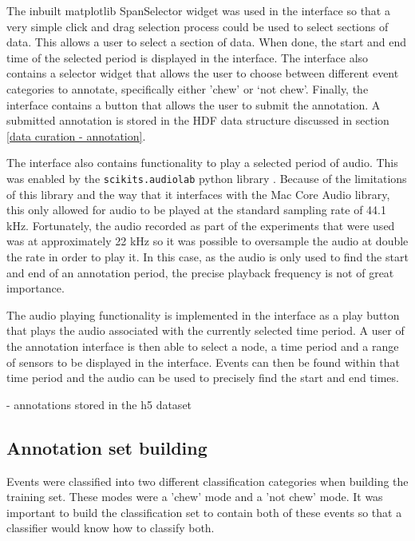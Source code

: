 The inbuilt matplotlib SpanSelector widget was used in the interface so that a very simple click and drag selection process could be used to select sections of data. This allows a user to select a section of data. When done, the start and end time of the selected period is displayed in the interface. The interface also contains a selector widget that allows the user to choose between different event categories to annotate, specifically either 'chew' or `not chew'. Finally, the interface contains a button that allows the user to submit the annotation. A submitted annotation is stored in the HDF data structure discussed in section \ref{data curation - annotation}. 

The interface also contains functionality to play a selected period of audio. This was enabled by the \texttt{scikits.audiolab} python library \cite{Cournapeau}. Because of the limitations of this library and the way that it interfaces with the Mac Core Audio library, this only allowed for audio to be played at the standard sampling rate of 44.1 kHz. Fortunately, the audio recorded as part of the experiments that were used was at approximately 22 kHz so it was possible to oversample the audio at double the rate in order to play it. In this case, as the audio is only used to find the start and end of an annotation period, the precise playback frequency is not of great importance. 

The audio playing functionality is implemented in the interface as a play button that plays the audio associated with the currently selected time period.  
A user of the annotation interface is then able to select a node, a time period and a range of sensors to be displayed in the interface. Events can then be found within that time period and the audio can be used to precisely find the start and end times. 



- annotations stored in the h5 dataset

\subsection{Annotation set building}

Events were classified into two different classification categories when building the training set. These modes were a 'chew' mode and a 'not chew' mode. It was important to build the classification set to contain both of these events so that a classifier would know how to classify both. 

